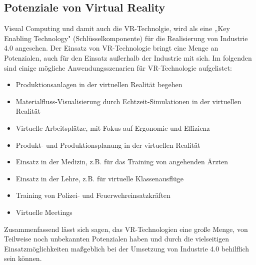 \subsection{Potenziale von Virtual Reality }\label{sec:VRPotentialUndAusblick}
Visual Computing und damit auch die VR-Technolgie, wird als eine „Key Enabling Technology" \cite[S.1]{5} (Schlüsselkomponente) für die Realisierung von Industrie 4.0 angesehen.
Der Einsatz von VR-Technologie bringt eine Menge an Potenzialen, auch für den Einsatz außerhalb der Industrie mit sich. Im folgenden sind einige mögliche Anwendungsszenarien für VR-Technologie aufgelistet:
\begin{itemize}
	\item Produktionsanlagen in der virtuellen Realität begehen \cite{33}
	\item Materialfluss-Visualisierung durch Echtzeit-Simulationen in der virtuellen Realität \cite{33}
	\item Virtuelle Arbeitsplätze, mit Fokus auf Ergonomie und Effizienz \cite{33}
	\item Produkt- und Produktionsplanung in der virtuellen Realität \cite{33}
	\item Einsatz in der Medizin, z.B. für das Training von angehenden Ärzten \cite{23}
	\item Einsatz in der Lehre, z.B. für virtuelle Klassenausflüge \cite{23}
	\item Training von Polizei- und Feuerwehreinsatzkräften \cite{23}
	\item Virtuelle Meetings \cite{23}
\end{itemize}
Zusammenfassend lässt sich sagen, das VR-Technologien eine große Menge, von Teilweise noch unbekannten Potenzialen haben und durch die vielseitigen Einsatzmöglichkeiten maßgeblich bei der Umsetzung von Industrie 4.0 behilflich sein können.

